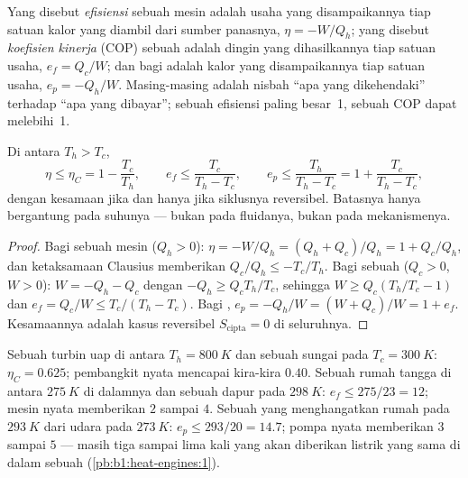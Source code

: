 \begin{definition}\label{def:b1:heat-engines:efficiency}
Yang disebut \emph{efisiensi} sebuah mesin adalah usaha yang disampaikannya tiap satuan kalor
yang diambil dari sumber panasnya, $\eta = -W/Q_h$; yang disebut
\emph{koefisien kinerja} (COP) sebuah  adalah dingin yang
dihasilkannya tiap satuan usaha, $e_f = Q_c/W$; dan bagi  adalah kalor yang
disampaikannya tiap satuan usaha, $e_p = -Q_h/W$. Masing-masing adalah nisbah ``apa yang
dikehendaki'' terhadap ``apa yang dibayar''; sebuah efisiensi paling besar~1, sebuah COP dapat
melebihi~1.
\end{definition}

\begin{theorem}[Carnot]\label{thm:b1:heat-engines:carnot}
Di antara  $T_h > T_c$,
\[
\eta \leq \eta_C = 1 - \frac{T_c}{T_h}, \qquad
e_f \leq \frac{T_c}{T_h - T_c}, \qquad
e_p \leq \frac{T_h}{T_h - T_c} = 1 + \frac{T_c}{T_h - T_c},
\]
dengan kesamaan jika dan hanya jika siklusnya reversibel. Batasnya hanya bergantung
pada suhunya --- bukan pada fluidanya, bukan pada mekanismenya.
\end{theorem}

\begin{proof}
Bagi sebuah mesin ($Q_h > 0$): $\eta = -W/Q_h = (Q_h + Q_c)/Q_h = 1 + Q_c/Q_h$,
dan ketaksamaan Clausius memberikan $Q_c/Q_h \leq -T_c/T_h$. Bagi sebuah
 ($Q_c > 0$, $W > 0$): $W = -Q_h - Q_c$ dengan $-Q_h \geq Q_c T_h/T_c$,
sehingga $W \geq Q_c(T_h/T_c - 1)$ dan $e_f = Q_c/W \leq T_c/(T_h - T_c)$.
Bagi , $e_p = -Q_h/W = (W + Q_c)/W = 1 + e_f$. Kesamaannya adalah
kasus reversibel $S_{\mathrm{cipta}} = 0$ di seluruhnya.
\end{proof}

\begin{example}\label{ex:b1:heat-engines:numbers}
Sebuah turbin uap di antara $T_h = \qty{800}{K}$ dan sebuah sungai pada
$T_c = \qty{300}{K}$: $\eta_C = 0.625$; pembangkit nyata mencapai kira-kira $0.40$.
Sebuah  rumah tangga di antara $\qty{275}{K}$ di dalamnya dan sebuah dapur pada
$\qty{298}{K}$: $e_f \leq 275/23 = 12$; mesin nyata memberikan $2$ sampai $4$. Sebuah
 yang menghangatkan rumah pada $\qty{293}{K}$ dari udara pada $\qty{273}{K}$:
$e_p \leq 293/20 = 14.7$; pompa nyata memberikan $3$ sampai $5$ --- masih tiga sampai
lima kali yang akan diberikan listrik yang sama di dalam sebuah 
(\cref{pb:b1:heat-engines:1}).
\end{example}

